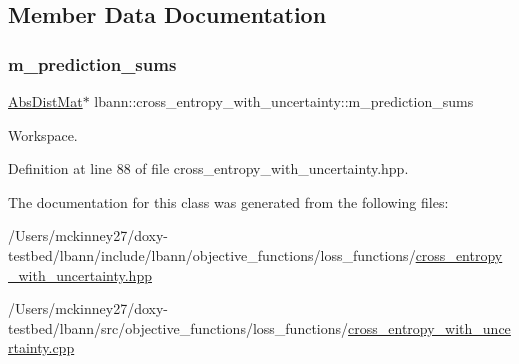 \subsection{Member Data Documentation}
\mbox{\label{classlbann_1_1cross__entropy__with__uncertainty_a4b45767c526e7ebe4a55ff1a1ddbd7ba}} 
\subsubsection{\texorpdfstring{m\+\_\+prediction\+\_\+sums}{m\_prediction\_sums}}
{\footnotesize\ttfamily \hyperlink{base_8hpp_a9a697a504ae84010e7439ffec862b470}{Abs\+Dist\+Mat}$\ast$ lbann\+::cross\+\_\+entropy\+\_\+with\+\_\+uncertainty\+::m\+\_\+prediction\+\_\+sums\hspace{0.3cm}{\ttfamily [private]}}

Workspace. 

Definition at line 88 of file cross\+\_\+entropy\+\_\+with\+\_\+uncertainty.\+hpp.



The documentation for this class was generated from the following files\+:\begin{DoxyCompactItemize}
\item 
/\+Users/mckinney27/doxy-\/testbed/lbann/include/lbann/objective\+\_\+functions/loss\+\_\+functions/\hyperlink{cross__entropy__with__uncertainty_8hpp}{cross\+\_\+entropy\+\_\+with\+\_\+uncertainty.\+hpp}\item 
/\+Users/mckinney27/doxy-\/testbed/lbann/src/objective\+\_\+functions/loss\+\_\+functions/\hyperlink{cross__entropy__with__uncertainty_8cpp}{cross\+\_\+entropy\+\_\+with\+\_\+uncertainty.\+cpp}\end{DoxyCompactItemize}
